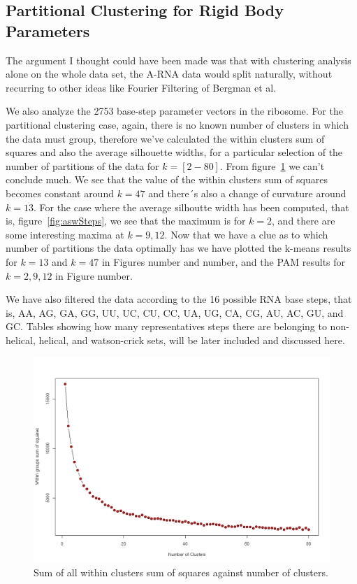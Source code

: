 \subsection{Partitional Clustering for Rigid Body Parameters}
The argument I thought could have been made was that with clustering
analysis alone on the whole data set, the A-RNA data would split
naturally, without recurring to other ideas like Fourier Filtering of
Bergman et al.

We also analyze the 2753 base-step parameter vectors in the ribosome.
For the partitional clustering case,
again, there  is no known  number of clusters  in which the  data must
group, therefore  we've calculated the within clusters  sum of squares
and also the average silhouette  widths, for a particular selection of
the  number   of  partitions  of   the  data  for   $k=[2-80]$.   From
figure~\ref{fig:wssSteps}  we can't  conclude  much. We  see that  the
value of  the within clusters  sum of squares becomes  constant around
$k=47$ and there´s also a  change of curvature around $k=13$.  For the
case where  the average  silhoutte width has  been computed,  that is,
figure~\ref{fig:aswSteps}, we  see that the maximum is  for $k=2$, and
there are  some interesting  maxima at $k=9,12$.   Now that we  have a
clue as to  which number of partitions the data  optimally has we have
plotted the  k-means results for  $k=13$ and $k=47$ in  Figures number
and number, and the PAM results for $k=2, 9, 12$ in Figure number.

We have also  filtered the data according to the  16 possible RNA base
steps, that is,  AA, AG, GA, GG, UU,  UC, CU, CC, UA, UG,  CA, CG, AU,
AC, GU, and  GC.  Tables showing how many  representatives steps there
are belonging to non-helical,  helical, and watson-crick sets, will be
later included and discussed here.
\begin{figure}[htbp]
\centering
\includegraphics[angle=0, scale=0.40]{Chapter2/hartigan_nuclu_steps_b.png}
\caption{Sum of all within clusters sum of squares against number of clusters.}
\label{fig:wssSteps}
\end{figure}

